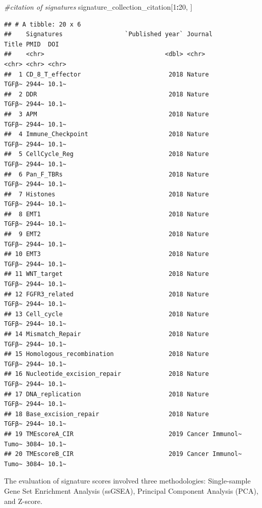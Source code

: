 \documentclass[
  12pt,
]{book}
\newenvironment{Shaded}{\begin{snugshade}}{\end{snugshade}}
\newcommand{\CommentTok}[1]{\textcolor[rgb]{0.56,0.35,0.01}{\textit{#1}}}
\newcommand{\DecValTok}[1]{\textcolor[rgb]{0.00,0.00,0.81}{#1}}
\newcommand{\NormalTok}[1]{#1}
\newcommand{\SpecialCharTok}[1]{\textcolor[rgb]{0.81,0.36,0.00}{\textbf{#1}}}
\begin{document}
\begin{Shaded}
\begin{Highlighting}[]
\CommentTok{\#citation of signatures}
\NormalTok{signature\_collection\_citation[}\DecValTok{1}\SpecialCharTok{:}\DecValTok{20}\NormalTok{, ]}
\end{Highlighting}
\end{Shaded}

\begin{verbatim}
## # A tibble: 20 x 6
##    Signatures                 `Published year` Journal         Title PMID  DOI  
##    <chr>                                 <dbl> <chr>           <chr> <chr> <chr>
##  1 CD_8_T_effector                        2018 Nature          TGFβ~ 2944~ 10.1~
##  2 DDR                                    2018 Nature          TGFβ~ 2944~ 10.1~
##  3 APM                                    2018 Nature          TGFβ~ 2944~ 10.1~
##  4 Immune_Checkpoint                      2018 Nature          TGFβ~ 2944~ 10.1~
##  5 CellCycle_Reg                          2018 Nature          TGFβ~ 2944~ 10.1~
##  6 Pan_F_TBRs                             2018 Nature          TGFβ~ 2944~ 10.1~
##  7 Histones                               2018 Nature          TGFβ~ 2944~ 10.1~
##  8 EMT1                                   2018 Nature          TGFβ~ 2944~ 10.1~
##  9 EMT2                                   2018 Nature          TGFβ~ 2944~ 10.1~
## 10 EMT3                                   2018 Nature          TGFβ~ 2944~ 10.1~
## 11 WNT_target                             2018 Nature          TGFβ~ 2944~ 10.1~
## 12 FGFR3_related                          2018 Nature          TGFβ~ 2944~ 10.1~
## 13 Cell_cycle                             2018 Nature          TGFβ~ 2944~ 10.1~
## 14 Mismatch_Repair                        2018 Nature          TGFβ~ 2944~ 10.1~
## 15 Homologous_recombination               2018 Nature          TGFβ~ 2944~ 10.1~
## 16 Nucleotide_excision_repair             2018 Nature          TGFβ~ 2944~ 10.1~
## 17 DNA_replication                        2018 Nature          TGFβ~ 2944~ 10.1~
## 18 Base_excision_repair                   2018 Nature          TGFβ~ 2944~ 10.1~
## 19 TMEscoreA_CIR                          2019 Cancer Immunol~ Tumo~ 3084~ 10.1~
## 20 TMEscoreB_CIR                          2019 Cancer Immunol~ Tumo~ 3084~ 10.1~
\end{verbatim}

The evaluation of signature scores involved three methodologies: Single-sample Gene Set Enrichment Analysis (ssGSEA), Principal Component Analysis (PCA), and Z-score.
\end{document}

